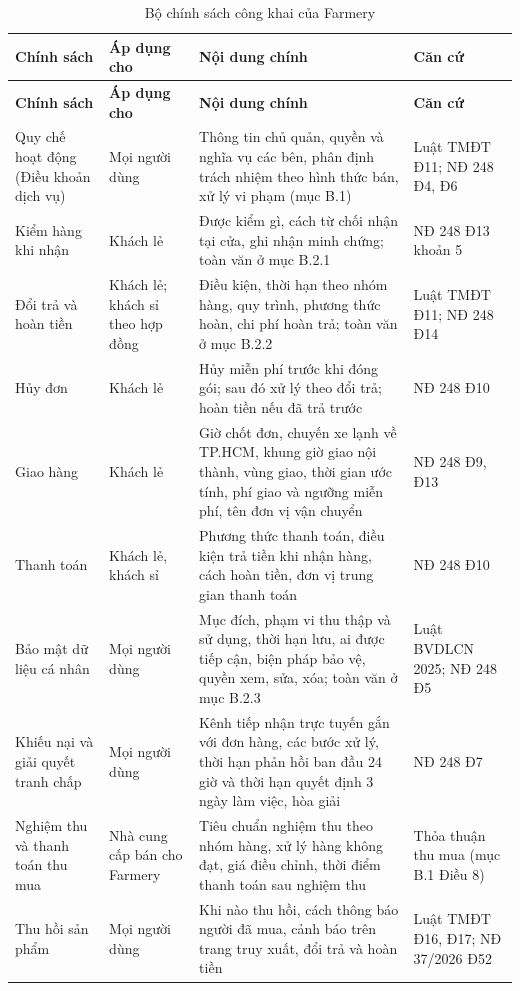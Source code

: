 \begingroup
\tblsetup\tblzebra
\begin{longtable}{L{3.30cm} L{2.70cm} L{6.20cm} L{2.70cm}}
\caption{Bộ chính sách công khai của Farmery}
\label{tab:bochinhsach} \\
\toprule
{}
\textbf{Chính sách} & \textbf{Áp dụng cho} & \textbf{Nội dung chính} & \textbf{Căn cứ} \\
\midrule
\endfirsthead
\toprule
{}
\textbf{Chính sách} & \textbf{Áp dụng cho} & \textbf{Nội dung chính} & \textbf{Căn cứ} \\
\midrule
\endhead
\bottomrule
\endfoot
Quy chế hoạt động (Điều khoản dịch vụ) & Mọi người dùng & Thông tin chủ quản, quyền và nghĩa vụ các bên, phân định trách nhiệm theo hình thức bán, xử lý vi phạm (mục B.1) & Luật TMĐT Đ11; NĐ 248 Đ4, Đ6 \\
Kiểm hàng khi nhận & Khách lẻ & Được kiểm gì, cách từ chối nhận tại cửa, ghi nhận minh chứng; toàn văn ở mục B.2.1 & NĐ 248 Đ13 khoản 5 \\
Đổi trả và hoàn tiền & Khách lẻ; khách sỉ theo hợp đồng & Điều kiện, thời hạn theo nhóm hàng, quy trình, phương thức hoàn, chi phí hoàn trả; toàn văn ở mục B.2.2 & Luật TMĐT Đ11; NĐ 248 Đ14 \\
Hủy đơn & Khách lẻ & Hủy miễn phí trước khi đóng gói; sau đó xử lý theo đổi trả; hoàn tiền nếu đã trả trước & NĐ 248 Đ10 \\
Giao hàng & Khách lẻ & Giờ chốt đơn, chuyến xe lạnh về TP.HCM, khung giờ giao nội thành, vùng giao, thời gian ước tính, phí giao và ngưỡng miễn phí, tên đơn vị vận chuyển & NĐ 248 Đ9, Đ13 \\
Thanh toán & Khách lẻ, khách sỉ & Phương thức thanh toán, điều kiện trả tiền khi nhận hàng, cách hoàn tiền, đơn vị trung gian thanh toán & NĐ 248 Đ10 \\
Bảo mật dữ liệu cá nhân & Mọi người dùng & Mục đích, phạm vi thu thập và sử dụng, thời hạn lưu, ai được tiếp cận, biện pháp bảo vệ, quyền xem, sửa, xóa; toàn văn ở mục B.2.3 & Luật BVDLCN 2025; NĐ 248 Đ5 \\
Khiếu nại và giải quyết tranh chấp & Mọi người dùng & Kênh tiếp nhận trực tuyến gắn với đơn hàng, các bước xử lý, thời hạn phản hồi ban đầu 24 giờ và thời hạn quyết định 3 ngày làm việc, hòa giải & NĐ 248 Đ7 \\
Nghiệm thu và thanh toán thu mua & Nhà cung cấp bán cho Farmery & Tiêu chuẩn nghiệm thu theo nhóm hàng, xử lý hàng không đạt, giá điều chỉnh, thời điểm thanh toán sau nghiệm thu & Thỏa thuận thu mua (mục B.1 Điều 8) \\
Thu hồi sản phẩm & Mọi người dùng & Khi nào thu hồi, cách thông báo người đã mua, cảnh báo trên trang truy xuất, đổi trả và hoàn tiền & Luật TMĐT Đ16, Đ17; NĐ 37/2026 Đ52 \\
\end{longtable}
\endgroup

